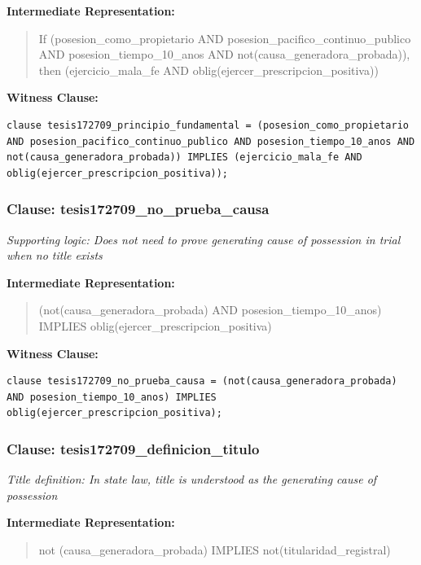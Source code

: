 \documentclass[11pt,a4paper]{article}
\begin{document}
\textbf{Intermediate Representation:}

\begin{quote}
If (posesion\_como\_propietario AND posesion\_pacifico\_continuo\_publico AND posesion\_tiempo\_10\_anos AND not(causa\_generadora\_probada)), then (ejercicio\_mala\_fe AND oblig(ejercer\_prescripcion\_positiva))
\end{quote}

\textbf{Witness Clause:}

\begin{lstlisting}[style=witnessstyle, language=Witness]
clause tesis172709_principio_fundamental = (posesion_como_propietario AND posesion_pacifico_continuo_publico AND posesion_tiempo_10_anos AND not(causa_generadora_probada)) IMPLIES (ejercicio_mala_fe AND oblig(ejercer_prescripcion_positiva));
\end{lstlisting}

\subsubsection{Clause: tesis172709\_no\_prueba\_causa}

\textit{Supporting logic: Does not need to prove generating cause of possession in trial when no title exists}

\textbf{Intermediate Representation:}

\begin{quote}
(not(causa\_generadora\_probada) AND posesion\_tiempo\_10\_anos) IMPLIES oblig(ejercer\_prescripcion\_positiva)
\end{quote}

\textbf{Witness Clause:}

\begin{lstlisting}[style=witnessstyle, language=Witness]
clause tesis172709_no_prueba_causa = (not(causa_generadora_probada) AND posesion_tiempo_10_anos) IMPLIES oblig(ejercer_prescripcion_positiva);
\end{lstlisting}

\subsubsection{Clause: tesis172709\_definicion\_titulo}

\textit{Title definition: In state law, title is understood as the generating cause of possession}

\textbf{Intermediate Representation:}

\begin{quote}
not (causa\_generadora\_probada) IMPLIES not(titularidad\_registral)
\end{quote}
\end{document}
